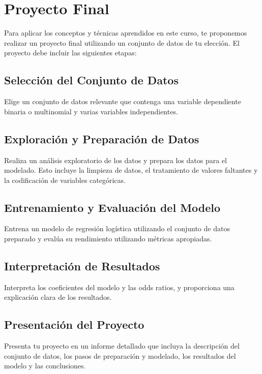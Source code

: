 \documentclass[a4paper]{report} %
\begin{document}
\section{Proyecto Final}

Para aplicar los conceptos y t\'ecnicas aprendidos en este curso, te proponemos realizar un proyecto final utilizando un conjunto de datos de tu elecci\'on. El proyecto debe incluir las siguientes etapas:

\subsection{Selecci\'on del Conjunto de Datos}

Elige un conjunto de datos relevante que contenga una variable dependiente binaria o multinomial y varias variables independientes.

\subsection{Exploraci\'on y Preparaci\'on de Datos}

Realiza un an\'alisis exploratorio de los datos y prepara los datos para el modelado. Esto incluye la limpieza de datos, el tratamiento de valores faltantes y la codificaci\'on de variables categ\'oricas.

\subsection{Entrenamiento y Evaluaci\'on del Modelo}

Entrena un modelo de regresi\'on log\'istica utilizando el conjunto de datos preparado y eval\'ua su rendimiento utilizando m\'etricas apropiadas.

\subsection{Interpretaci\'on de Resultados}

Interpreta los coeficientes del modelo y las odds ratios, y proporciona una explicaci\'on clara de los resultados.

\subsection{Presentaci\'on del Proyecto}

Presenta tu proyecto en un informe detallado que incluya la descripci\'on del conjunto de datos, los pasos de preparaci\'on y modelado, los resultados del modelo y las conclusiones.
\end{document}
